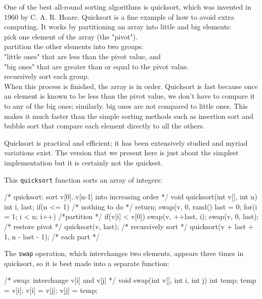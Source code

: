 One of the best all-round sorting algorithms is quicksort, which was
invented in 1960 by C. A. R. Hoare. Quicksort is a fine example of how to
avoid extra computing. It works by partitioning an array into little and
big elements:                                                           \\
\indent pick one element of the array (the "pivot").                    \\
\indent partition the other elements into two groups:                   \\
\indent \indent "little ones" that are less than the pivot value, and   \\
\indent \indent "big ones" that are greater than or equal to the pivot
value.                                                                  \\
\indent recursively sort each group.                                    \\
When this process is finished, the array is in order. Quicksort is fast
because once an element is known to be less than the pivot value, we don't
have to compare it to any of the big ones; similarly. big ones are not
compared to little ones. This makes it much faster than the simple sorting
methods such as insertion sort and bubble sort that compare each element
directly to all the others.

Quicksort is practical and efficient; it has been extensively studied and
myriad variations exist. The version that we present here is just about the
simplest implementation but it is certainly not the quickest.

This \verb'quicksort' function sorts an array of integers:
\begin{wellcode}
    /* quicksort: sort v[0]..v[n-1] into increasing order */
    void quicksort(int v[], int n)
    {
        int i, last;
        if(n <= 1) /* nothing to do */
        {
            return;
        }
        swap(v, 0, rand() %
        last = 0;
        for(i = 1; i < n; i++)  /*partition */
        {
            if(v[i] < v[0])
            {
                swap(v, ++last, i);
            }
            swap(v, 0, last);   /* restore pivot */
            quicksort(v, last); /* recursively sort */
            quicksort(v + last + 1, n - last - 1); /* each part */
        }
    }
\end{wellcode}

The \verb'swap' operation, which interchanges two elements, appears three
times in quicksort, so it is best made into a separate function:
\begin{wellcode}
    /* swap: interchange v[i] and v[j] */
    void swap(int v[], int i, int j)
    {
        int temp;
        temp = v[i];
        v[i] = v[j];
        v[j] = temp;
    }
\end{wellcode}

